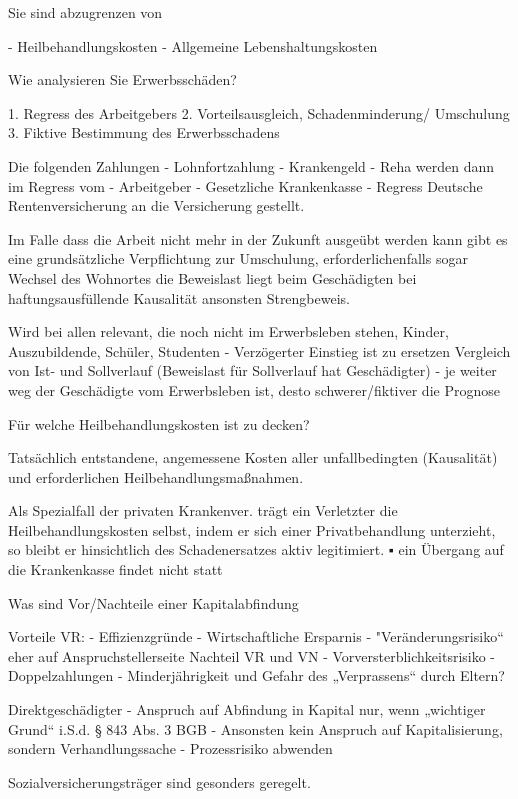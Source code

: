 Sie sind abzugrenzen von

- Heilbehandlungskosten
- Allgemeine Lebenshaltungskosten



Wie analysieren Sie Erwerbsschäden?

1. Regress des Arbeitgebers
2. Vorteilsausgleich, Schadenminderung/ Umschulung
3. Fiktive Bestimmung des Erwerbsschadens

Die folgenden Zahlungen 
- Lohnfortzahlung
- Krankengeld
- Reha
werden dann im Regress vom 
- Arbeitgeber
- Gesetzliche Krankenkasse
- Regress Deutsche Rentenversicherung
an die Versicherung gestellt.

Im Falle dass die Arbeit nicht mehr in der Zukunft ausgeübt werden kann gibt es eine
grundsätzliche Verpflichtung zur Umschulung, erforderlichenfalls sogar Wechsel des Wohnortes
die Beweislast liegt beim Geschädigten bei haftungsausfüllende Kausalität ansonsten Strengbeweis.

Wird bei allen relevant, die noch nicht im Erwerbsleben stehen, Kinder, Auszubildende, Schüler,
Studenten
- Verzögerter Einstieg ist zu ersetzen
Vergleich von Ist- und Sollverlauf (Beweislast für Sollverlauf hat Geschädigter)
- je weiter weg der Geschädigte vom Erwerbsleben ist, desto schwerer/fiktiver die Prognose

Für welche Heilbehandlungskosten ist zu decken?

Tatsächlich entstandene, angemessene Kosten aller unfallbedingten (Kausalität) und erforderlichen
Heilbehandlungsmaßnahmen.

Als Spezialfall der privaten Krankenver.
trägt ein Verletzter die Heilbehandlungskosten selbst, indem er sich einer Privatbehandlung
unterzieht, so bleibt er hinsichtlich des Schadenersatzes aktiv legitimiert.
▪ ein Übergang auf die Krankenkasse findet nicht statt


Was sind Vor/Nachteile einer Kapitalabfindung

Vorteile VR:
- Effizienzgründe
- Wirtschaftliche Ersparnis
- "Veränderungsrisiko“ eher auf Anspruchstellerseite
Nachteil VR und VN
- Vorversterblichkeitsrisiko
- Doppelzahlungen
- Minderjährigkeit und Gefahr des „Verprassens“ durch Eltern?

Direktgeschädigter
- Anspruch auf Abfindung in Kapital nur, wenn „wichtiger Grund“ i.S.d. § 843 Abs. 3 BGB
- Ansonsten kein Anspruch auf Kapitalisierung, sondern Verhandlungssache
- Prozessrisiko abwenden

Sozialversicherungsträger sind gesonders geregelt.

